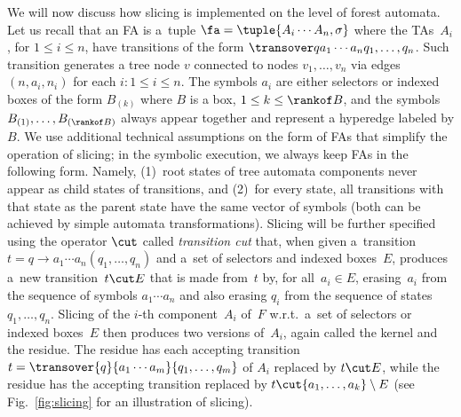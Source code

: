 {We will now discuss how slicing is implemented on the level of forest automata.
Let us recall that an FA is a~tuple $\fa = \tuple{A_i \cdots A_n,\sigma}$ where the TAs~$A_i$, for $1\leq i \leq n$,
have transitions of the form $\transover q {a_1\cdots a_n} {q_1,\ldots, q_n}$. 
Such transition generates a tree node $v$ connected to nodes $v_1,\ldots,v_n$ via edges $(n,a_i,n_i)$ for each $i:1\leq i \leq n$.   
The symbols $a_i$ are either selectors or indexed boxes of the form $B_{(k)}$ where $B$ is a box, $1\leq k \leq \rankof B$, and
the symbols $B_{(1)},\ldots,B_{(\rankof B)}$ always appear together and represent a hyperedge labeled by $B$.
%
We use additional technical assumptions on the form of FAs that simplify the
operation of slicing; in the symbolic execution, we always keep FAs in the following form.
%
Namely, (1)~root states of tree automata components never appear as child
states of transitions, and
(2)~for every state, all transitions with that state as the parent state have
the same vector of symbols
(both can be achieved by simple automata transformations).
%
Slicing will be further specified using the operator $\cut$ called
\emph{transition cut} that, when given a~transition $t =  q \rightarrow
a_1\cdots a_n (q_1,\dots,q_n)$ and a~set of selectors and indexed boxes~$E$,
produces a~new transition~$t \cut E$ that is made from~$t$ by, for all~$a_i \in
E$, erasing~$a_i$ from the sequence of symbols $a_1 \cdots a_n$ and also
erasing $q_i$ from the sequence of states $q_1,\ldots,q_n$.
%
Slicing of the $i$-th component~$A_i$ of~$F$ w.r.t.\ a~set of selectors or
indexed boxes~$E$ then produces two versions of~$A_i$, again called the kernel
and the residue.
The residue has each accepting transition $t = \transover {q}
{a_1\cdots a_m} {q_1,\ldots,q_m}$ of $A_i$ replaced by $t\cut E$, while the
residue has the accepting transition replaced by $t\cut
\{a_1,\ldots,a_k\}\setminus E$ (see Fig.~\ref{fig:slicing} for an illustration
of slicing).
 


}
